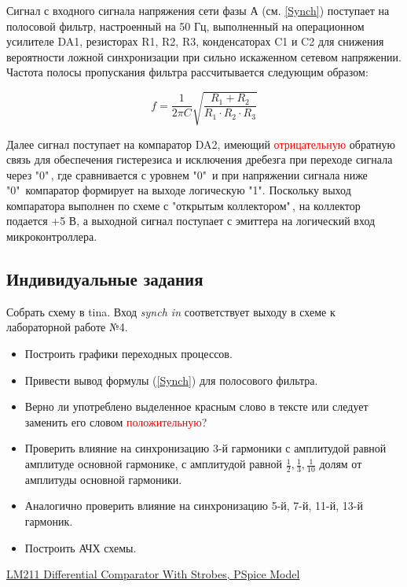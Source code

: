 Сигнал с входного сигнала напряжения сети фазы А (см. \ref{Synch}) поступает на полосовой фильтр, настроенный на 50 Гц, 
выполненный на операционном усилителе DA1, резисторах R1, R2, R3, конденсаторах C1 и C2 для снижения вероятности ложной синхронизации 
при сильно искаженном сетевом напряжении. Частота полосы пропускания фильтра рассчитывается следующим образом:

\begin{equation}
	f = \frac{1}{2\pi C} \sqrt{\frac{R_1+R_2}{R_1\cdot R_2 \cdot R_3}}
\label{f}
\end{equation}

 Далее сигнал поступает на компаратор DA2, имеющий \textcolor{red}{отрицательную} обратную связь для обеспечения гистерезиса и исключения дребезга 
 при переходе сигнала через "$0$"\,, где сравнивается с уровнем "0"\  и при напряжении сигнала ниже "0"\  компаратор формирует на выходе логическую "1". 
 Поскольку выход компаратора выполнен по схеме с "открытым коллектором"\,, на коллектор подается +5 В, 
 а выходной сигнал поступает с эмиттера на логический вход микроконтроллера.

\subsection{Индивидуальные задания}

Собрать схему в tina. Вход {\it synch in} соответствует выходу в схеме к лабораторной работе №4. 

\begin{itemize}
	\item Построить графики переходных процессов.

	\item Привести вывод формулы (\ref{Synch}) для полосового фильтра.

	\item Верно ли употреблено выделенное красным слово в тексте или следует заменить его словом \textcolor{red}{положительную}?

	\item Проверить влияние на синхронизацию 3-й гармоники с амплитудой равной амплитуде основной гармонике, 
		с амплитудой равной $\frac{1}{2}, \frac{1}{3}, \frac{1}{10}$ долям от амплитуды основной гармоники.

	\item Аналогично проверить влияние на синхронизацию 5-й, 7-й, 11-й, 13-й гармоник.

	\item Построить АЧХ схемы.
\end{itemize}
\renewcommand{\bibname}{}
\begin{thebibliography}{3} 
	 \href{https://www.ti.com/product/LM211}{LM211 Differential Comparator With Strobes, PSpice Model}
\end{thebibliography}


